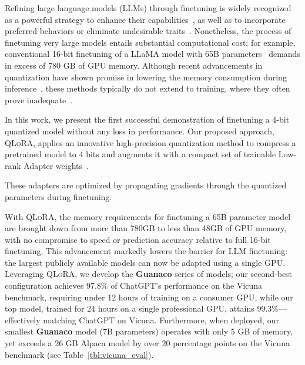 Refining large language models (LLMs) through finetuning is widely recognized as a powerful strategy to enhance their capabilities~\citep{min2021metaicl, wei2021finetuned, ouyang2022training, wang2022super, wang2022self, liu2022few}, as well as to incorporate preferred behaviors or eliminate undesirable traits~\citep{ouyang2022training,askell2021general,bai2022training}. Nonetheless, the process of finetuning very large models entails substantial computational cost; for example, conventional 16-bit finetuning of a LLaMA model with 65B parameters~\citep{touvron2023llama} demands in excess of 780 GB of GPU memory. Although recent advancements in quantization have shown promise in lowering the memory consumption during inference~\citep{dettmers2022llm, dettmers2022case, frantar2022gptq, xiao2022smoothquant}, these methods typically do not extend to training, where they often prove inadequate~\citep{wortsman2023stable}.

In this work, we present the first successful demonstration of finetuning a 4-bit quantized model without any loss in performance. Our proposed approach, \textsc{QLoRA}, applies an innovative high-precision quantization method to compress a pretrained model to 4 bits and augments it with a compact set of trainable Low-rank Adapter weights~\citep{hu2021lora}. 

These adapters are optimized by propagating gradients through the quantized parameters during finetuning.

With \textsc{QLoRA}, the memory requirements for finetuning a 65B parameter model are brought down from more than 780GB to less than 48GB of GPU memory, with no compromise to speed or prediction accuracy relative to full 16-bit finetuning. This advancement markedly lowers the barrier for LLM finetuning: the largest publicly available models can now be adapted using a single GPU. Leveraging \textsc{QLoRA}, we develop the \textbf{Guanaco} series of models; our second-best configuration achieves 97.8\% of ChatGPT's performance on the Vicuna~\citep{vicuna2023} benchmark, requiring under 12 hours of training on a consumer GPU, while our top model, trained for 24 hours on a single professional GPU, attains 99.3\%—effectively matching ChatGPT on Vicuna. Furthermore, when deployed, our smallest \textbf{Guanaco} model (7B parameters) operates with only 5 GB of memory, yet exceeds a 26 GB Alpaca model by over 20 percentage points on the Vicuna benchmark (see Table~\ref{tbl:vicuna_eval}).

